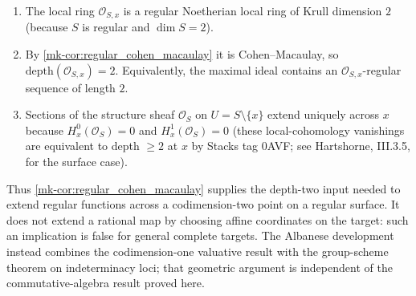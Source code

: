 \begin{enumerate}
  \item The local ring \(\mathcal{O}_{S,x}\) is a regular Noetherian local ring of Krull
    dimension \(2\) (because \(S\) is regular and \(\dim S = 2\)).
  \item By \ref{mk-cor:regular_cohen_macaulay} it is Cohen--Macaulay, so
    \(\text{depth}(\mathcal{O}_{S,x}) = 2\). Equivalently, the maximal ideal contains an
    \(\mathcal{O}_{S,x}\)-regular sequence of length \(2\).
  \item Sections of the structure sheaf \(\mathcal{O}_S\) on \(U = S \setminus \{x\}\) extend
    uniquely across \(x\) because \(H^0_x(\mathcal{O}_S) = 0\) and
    \(H^1_x(\mathcal{O}_S) = 0\) (these local-cohomology vanishings are equivalent to depth
    \(\geq 2\) at \(x\) by Stacks tag 0AVF; see Hartshorne, III.3.5, for the surface case).
\end{enumerate}

Thus \ref{mk-cor:regular_cohen_macaulay} supplies the depth-two input needed to extend regular
functions across a codimension-two point on a regular surface.  It does not extend a rational map
by choosing affine coordinates on the target: such an implication is false for general complete
targets.  The Albanese development instead combines the codimension-one valuative result with the
group-scheme theorem on indeterminacy loci; that geometric argument is independent of the
commutative-algebra result proved here.
